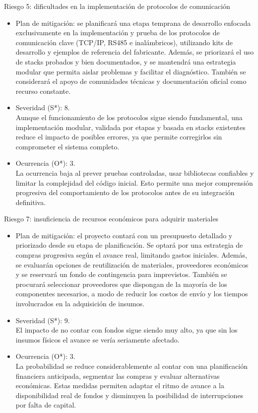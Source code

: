 \documentclass[
11pt, %
]{charter}
\begin{document}
Riesgo 5: dificultades en la implementación de protocolos de comunicación
\begin{itemize}
	\item Plan de mitigación: se planificará una etapa temprana de desarrollo enfocada exclusivamente en la implementación y prueba de los protocolos de comunicación clave (TCP/IP, RS485 e inalámbricos), utilizando kits de desarrollo y ejemplos de referencia del fabricante. Además, se priorizará el uso de stacks probados y bien documentados, y se mantendrá una estrategia modular que permita aislar problemas y facilitar el diagnóstico. También se considerará el apoyo de comunidades técnicas y documentación oficial como recurso constante.
	\item Severidad (S*): 8. \\ Aunque el funcionamiento de los protocolos sigue siendo fundamental, una implementación modular, validada por etapas y basada en stacks existentes reduce el impacto de posibles errores, ya que permite corregirlos sin comprometer el sistema completo.
	\item Ocurrencia (O*): 3. \\ La ocurrencia baja al prever pruebas controladas, usar bibliotecas confiables y limitar la complejidad del código inicial. Esto permite una mejor comprensión progresiva del comportamiento de los protocolos antes de su integración definitiva.
\end{itemize}

\newpage
Riesgo 7: insuficiencia de recursos económicos para adquirir materiales
\begin{itemize}
	\item Plan de mitigación: el proyecto contará con un presupuesto detallado y priorizado desde su etapa de planificación. Se optará por una estrategia de compras progresiva según el avance real, limitando gastos iniciales. Además, se evaluarán opciones de reutilización de materiales, proveedores económicos y se reservará un fondo de contingencia para imprevistos. También se procurará seleccionar proveedores que dispongan de la mayoría de los componentes necesarios, a modo de reducir los costos de envío y los tiempos involucrados en la adquisición de insumos.
	\item Severidad (S*): 9. \\ El impacto de no contar con fondos sigue siendo muy alto, ya que sin los insumos físicos el avance se vería seriamente afectado.
	\item Ocurrencia (O*): 3. \\ La probabilidad se reduce considerablemente al contar con una planificación financiera anticipada, segmentar las compras y evaluar alternativas económicas. Estas medidas permiten adaptar el ritmo de avance a la disponibilidad real de fondos y disminuyen la posibilidad de interrupciones por falta de capital.
\end{itemize}
\end{document}
